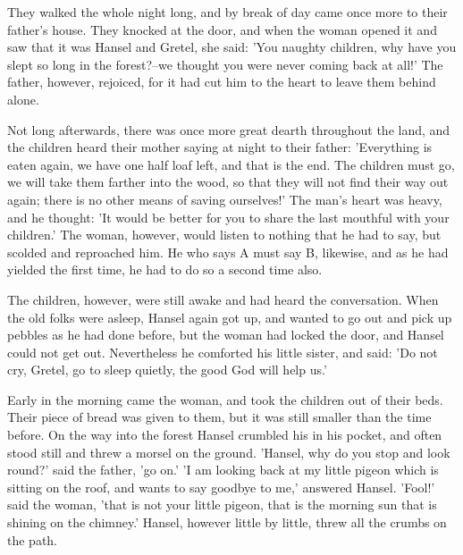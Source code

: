 \documentclass[12pt]{book}
\begin{document}
They walked the whole night long, and by break of day came once more
to their father's house. They knocked at the door, and when the woman
opened it and saw that it was Hansel and Gretel, she said: 'You
naughty children, why have you slept so long in the forest?--we
thought you were never coming back at all!' The father, however,
rejoiced, for it had cut him to the heart to leave them behind alone.

Not long afterwards, there was once more great dearth throughout the
land, and the children heard their mother saying at night to their
father: 'Everything is eaten again, we have one half loaf left, and
that is the end. The children must go, we will take them farther into
the wood, so that they will not find their way out again; there is no
other means of saving ourselves!' The man's heart was heavy, and he
thought: 'It would be better for you to share the last mouthful with
your children.' The woman, however, would listen to nothing that he
had to say, but scolded and reproached him. He who says A must say B,
likewise, and as he had yielded the first time, he had to do so a
second time also.

The children, however, were still awake and had heard the
conversation. When the old folks were asleep, Hansel again got up, and
wanted to go out and pick up pebbles as he had done before, but the
woman had locked the door, and Hansel could not get out. Nevertheless
he comforted his little sister, and said: 'Do not cry, Gretel, go to
sleep quietly, the good God will help us.'

Early in the morning came the woman, and took the children out of
their beds. Their piece of bread was given to them, but it was still
smaller than the time before. On the way into the forest Hansel
crumbled his in his pocket, and often stood still and threw a morsel
on the ground. 'Hansel, why do you stop and look round?' said the
father, 'go on.' 'I am looking back at my little pigeon which is
sitting on the roof, and wants to say goodbye to me,' answered Hansel.
'Fool!' said the woman, 'that is not your little pigeon, that is the
morning sun that is shining on the chimney.' Hansel, however little by
little, threw all the crumbs on the path.
\end{document}
